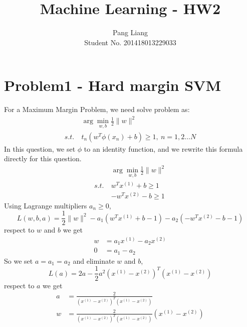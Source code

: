 \documentclass[12pt]{article}
\title{Machine Learning - HW2}
\author{Pang Liang\\ Student No. 201418013229033}
\begin{document}
\maketitle

\section{Problem1 - Hard margin SVM}
For a Maximum Margin Problem, we need solve problem as: 
\begin{equation}
	\begin{split}
		&\arg{\min}_{w,b} \frac{1}{2} \|w\|^2 \\
		s.t.\ &t_n(w^T \phi(x_n) + b) \geq 1,\ n=1, 2 \dots N
	\end{split}
\end{equation}
In this question, we set $\phi$ to an identity function, and we rewrite this formula directly for this question.
\begin{equation}
	\begin{split}
		&\arg{\min}_{w,b} \frac{1}{2} \|w\|^2 \\
		s.t.\ &w^T x^{(1)}+b \geq 1 \\
		      &-w^T x^{(2)}-b \geq 1 
	\end{split}
\end{equation}
Using Lagrange multipliers $a_n \geq 0$,
\begin{equation}
	L(w,b,a) = \frac{1}{2}\|w\|^2 - a_1(w^Tx^{(1)}+b-1) - a_2(-w^Tx^{(2)}-b-1)
\end{equation}
respect to $w$ and $b$ we get
\begin{equation}
	\begin{split}
		w &= a_1 x^{(1)} - a_2 x^{(2)} \\
		0 &= a_1 - a_2
	\end{split}
\end{equation}
So we set $a = a_1 = a_2$ and eliminate $w$ and $b$,
\begin{equation}
	L(a) = 2a - \frac{1}{2} a^2 (x^{(1)} - x^{(2)})^T (x^{(1)} - x^{(2)})
\end{equation}
respect to $a$ we get
\begin{equation}
	\begin{split}
	a &= \frac{2}{(x^{(1)} - x^{(2)})^T (x^{(1)} - x^{(2)})}\\	
	w &= \frac{2}{(x^{(1)} - x^{(2)})^T (x^{(1)} - x^{(2)})} (x^{(1)} - x^{(2)})
	\end{split}
\end{equation}
\end{document}
